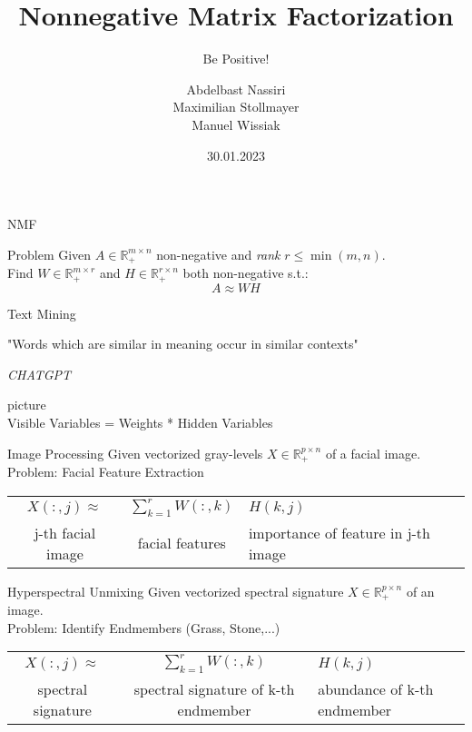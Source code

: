\documentclass[aspectratio=169]{beamer}
\title{Nonnegative Matrix Factorization}
\subtitle{Be Positive!}
\author{Abdelbast Nassiri \\ Maximilian Stollmayer \\ Manuel Wissiak}
\institute{University of Vienna}
\date{30.01.2023}
\begin{document}
\titleframe


\begin{frame}{NMF}
    \begin{block}{Problem}
        Given \(A \in \mathbb{R}^{m \times n}_+\) non-negative and \emph{rank} \(r \leq \min(m, n)\). \\
        Find \(W \in \mathbb{R}^{m \times r}_+\) and \(H \in \mathbb{R}^{r \times n}_+\) both non-negative s.t.: \\
        \[A \approx WH\]
    \end{block}
\end{frame}

\begin{frame}{Text Mining}
    \epigraph{"Words which are similar in meaning occur in similar contexts"} {\textit{CHATGPT}}
    picture \\
    Visible Variables = Weights * Hidden Variables
    
\end{frame}

\begin{frame}{Image Processing}
    Given vectorized gray-levels \(X \in \mathbb{R}^{p \times n}_+\) of a facial image. \\
    Problem: Facial Feature Extraction
    \begin{center}
    \begin{tabular}{ c c l }
     \(X(:,j) \approx \) &  \(\sum_{k=1}^{r} W(:,k) \) & \(H(k,j)\) \\ 
     j-th facial image & facial features & importance of feature in j-th image 
    \end{tabular}
    \end{center}
     
\end{frame}

\begin{frame}{Hyperspectral Unmixing}
    Given vectorized spectral signature \(X \in \mathbb{R}^{p \times n}_+\) of an image. \\
    Problem: Identify Endmembers (Grass, Stone,...)

    \begin{center}
    \begin{tabular}{ c c l }
     \(X(:,j) \approx \) &  \(\sum_{k=1}^{r} W(:,k) \) & \(H(k,j)\) \\ 
     spectral signature & spectral signature of k-th endmember & abundance of k-th endmember
    \end{tabular}
    \end{center}
      
\end{frame}
\end{document}

